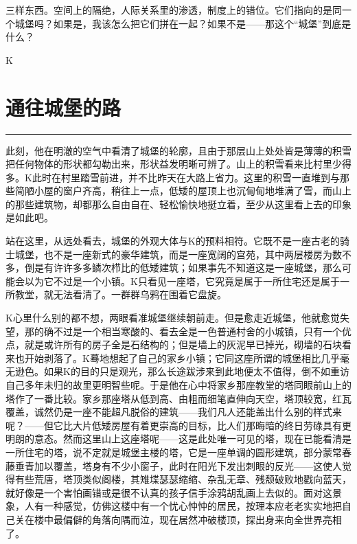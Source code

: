 \documentclass[12pt,a4paper]{article}
\begin{document}
三样东西。空间上的隔绝，人际关系里的渗透，制度上的错位。它们指向的是同一个城堡吗？如果是，我该怎么把它们拼在一起？如果不是——那这个“城堡”到底是什么？



K

\newpage
\section{通往城堡的路}
\vspace{0.5em}
\vspace{0.3em}

\noindent\rule{\textwidth}{0.4pt}

\vspace{0.3em}



此刻，他在明澈的空气中看清了城堡的轮廓，且由于那层山上处处皆是薄薄的积雪把任何物体的形状都勾勒出来，形状益发明晰可辨了。山上的积雪看来比村里少得多。K此时在村里踏雪前进，并不比昨天在大路上省力。这里的积雪一直堆到与那些简陋小屋的窗户齐高，稍往上一点，低矮的屋顶上也沉甸甸地堆满了雪，而山上的那些建筑物，却都那么自由自在、轻松愉快地挺立着，至少从这里看上去的印象是如此吧。

站在这里，从远处看去，城堡的外观大体与K的预料相符。它既不是一座古老的骑士城堡，也不是一座新式的豪华建筑，而是一座宽阔的宫苑，其中两层楼房为数不多，倒是有许许多多鳞次栉比的低矮建筑；如果事先不知道这是一座城堡，那么可能会以为它不过是一个小镇。K只看见一座塔，它究竟是属于一所住宅还是属于一所教堂，就无法看清了。一群群乌鸦在围着它盘旋。

K心里什么别的都不想，两眼看准城堡继续朝前走。但是愈走近城堡，他就愈觉失望，那的确不过是一个相当寒酸的、看去全是一色普通村舍的小城镇，只有一个优点，就是或许所有的房子全是石结构的；但是墙上的灰泥早已掉光，砌墙的石块看来也开始剥落了。K蓦地想起了自己的家乡小镇；它同这座所谓的城堡相比几乎毫无逊色。如果K的目的只是观光，那么长途跋涉来到此地便太不值得，倒不如重访自己多年未归的故里更明智些呢。于是他在心中将家乡那座教堂的塔同眼前山上的塔作了一番比较。家乡那座塔从低到高、由粗而细笔直伸向天空，塔顶较宽，红瓦覆盖，诚然仍是一座不能超凡脱俗的建筑——我们凡人还能盖出什么别的样式来呢？——但它比大片低矮房屋有着更崇高的目标，比人们那晦暗的终日劳碌具有更明朗的意态。然而这里山上这座塔呢——这是此处唯一可见的塔，现在已能看清是一所住宅的塔，说不定就是城堡主楼的塔，它是一座单调的圆形建筑，部分蒙常春藤垂青加以覆盖，塔身有不少小窗子，此时在阳光下发出刺眼的反光——这使人觉得有些荒唐，塔顶类似阁楼，其雉堞瑟瑟缩缩、杂乱无章、残颓破败地戳向蓝天，就好像是一个害怕画错或是很不认真的孩子信手涂鸦胡乱画上去似的。面对这景象，人有一种感觉，仿佛这楼中有一个忧心忡忡的居民，按理本应老老实实地把自己关在楼中最偏僻的角落向隅而泣，现在居然冲破楼顶，探出身来向全世界亮相了。
\end{document}
